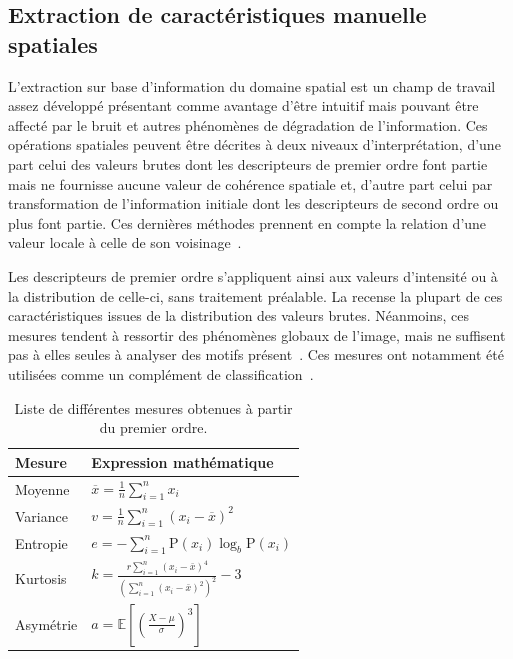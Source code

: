 \subsection{Extraction de caractéristiques manuelle spatiales}
L'extraction sur base d'information du domaine spatial est un champ de travail assez développé présentant comme avantage d'être intuitif mais pouvant être affecté par le bruit et autres phénomènes de dégradation de l'information. Ces opérations spatiales peuvent être décrites à deux niveaux d'interprétation, d'une part celui des valeurs brutes dont les descripteurs de premier ordre font partie mais ne fournisse aucune valeur de cohérence spatiale et, d'autre part celui par transformation de l'information initiale dont les descripteurs de second ordre ou plus font partie. Ces dernières méthodes prennent en compte la relation d'une valeur locale à celle de son voisinage~\cite{Kamila2015}.\par

Les descripteurs de premier ordre s'appliquent ainsi aux valeurs d'intensité ou à la distribution de celle-ci, sans traitement préalable. La  recense la plupart de ces caractéristiques issues de la distribution des valeurs brutes. Néanmoins, ces mesures tendent à ressortir des phénomènes globaux de l'image, mais ne suffisent pas à elles seules à analyser des motifs présent~\cite{Tomita1990, Srinivasan2008, Uyun2013, NyeinNyeinHlaing2015}. Ces mesures ont notamment été utilisées comme un complément de classification~\cite{Wiltgen2008}.\par

\begin{table}[H]
    \centering
    \begin{tabular}{ll}
        \toprule
        \textbf{Mesure}             & \textbf{Expression mathématique}                                                  \\ \hline
        Moyenne                     & $\overline{x} = \frac{1}{n}\sum_{i=1}^n x_i$                                      \\   
        Variance                    & $v = \frac{1}{n}\sum_{i=1}^n \left(x_i - \overline{x}\right)^2$                   \\ 
        Entropie                    & $e = -\sum_{i=1}^n {\mathrm{P}(x_i) \log_b \mathrm{P}(x_i)}$                      \\
        Kurtosis                    & $k=\frac{r \sum_{i=1}^{n}\left(x_{i}-\bar{x}\right)^{4}}{\left(\sum_{i=1}^{n}\left(x_{i}-\bar{x}\right)^{2}\right)^{2}}-3$\\
        Asymétrie                   & $a = \mathbb{E} \left[ \left( \frac{X - \mu}{\sigma} \right)^3 \right]$           \\  
        \bottomrule
    \end{tabular}
    \caption{Liste de différentes mesures obtenues à partir du premier ordre.}
    \label{tab:first_order_descriptors}
\end{table}\par

